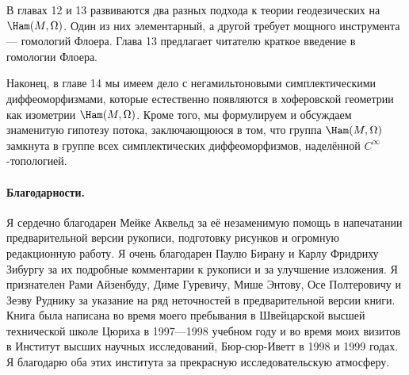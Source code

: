 В главах 12 и 13 развиваются два разных подхода к теории геодезических на $\Ham(M,\Omega)$.
Один из них элементарный, а другой требует мощного инструмента — гомологий Флоера.
Глава 13 предлагает читателю краткое введение в гомологии Флоера.

Наконец, в главе 14 мы имеем дело с негамильтоновыми симплектическими диффеоморфизмами, которые естественно появляются в хоферовской геометрии как изометрии $\Ham(M,\Omega)$.
Кроме того, мы формулируем и обсуждаем знаменитую гипотезу потока,
заключающююся в том, что группа $\Ham(M,\Omega)$ замкнута в группе всех симплектических диффеоморфизмов, наделённой $C^\infty$-топологией. 


\paragraph*{Благодарности.}
Я сердечно благодарен Мейке Аквельд %
за её незаменимую помощь в напечатании предварительной версии рукописи,
подготовку рисунков и огромную редакционную работу.
Я очень благодарен Паулю Бирану и Карлу Фридриху Зибургу за их подробные комментарии к рукописи и за улучшение изложения.
Я признателен 
Рами Айзенбуду,
Диме Гуревичу, 
Мише Энтову, 
Осе Полтеровичу
и Зеэву Руднику за указание на ряд неточностей в предварительной версии книги.
Книга была написана во время моего пребывания в Швейцарской высшей технической школе Цюриха в 1997—1998 учебном году и во время моих визитов в Институт высших научных исследований, Бюр-сюр-Иветт в 1998 и 1999 годах.
Я благодарю оба этих института за прекрасную исследовательскую атмосферу. 
